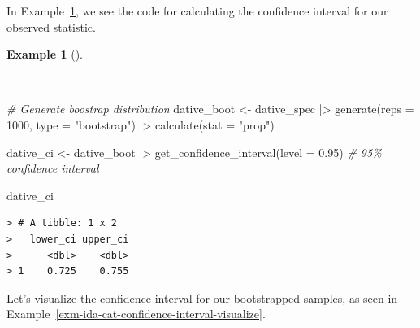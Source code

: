 \documentclass[
  letterpaper,
]{latex/krantz}
\newenvironment{Shaded}{\begin{snugshade}}{\end{snugshade}}
\newcommand{\AttributeTok}[1]{\textcolor[rgb]{0.00,0.00,0.00}{#1}}
\newcommand{\CommentTok}[1]{\textcolor[rgb]{0.00,0.00,0.00}{\textit{#1}}}
\newcommand{\DecValTok}[1]{\textcolor[rgb]{0.00,0.00,0.00}{#1}}
\newcommand{\FloatTok}[1]{\textcolor[rgb]{0.00,0.00,0.00}{#1}}
\newcommand{\FunctionTok}[1]{\textcolor[rgb]{0.00,0.00,0.00}{#1}}
\newcommand{\NormalTok}[1]{\textcolor[rgb]{0.00,0.00,0.00}{#1}}
\newcommand{\OtherTok}[1]{\textcolor[rgb]{0.00,0.00,0.00}{#1}}
\newcommand{\SpecialCharTok}[1]{\textcolor[rgb]{0.00,0.00,0.00}{#1}}
\newcommand{\StringTok}[1]{\textcolor[rgb]{0.00,0.00,0.00}{#1}}
\theoremstyle{definition}
\newtheorem{example}{Example}[chapter]
\theoremstyle{remark}
\begin{document}
In Example~\ref{exm-ida-cat-confidence-interval}, we see the code for
calculating the confidence interval for our observed statistic.

\begin{example}[]\protect\hypertarget{exm-ida-cat-confidence-interval}{}\label{exm-ida-cat-confidence-interval}

~

\begin{Shaded}
\begin{Highlighting}[]
\CommentTok{\# Generate boostrap distribution}
\NormalTok{dative\_boot }\OtherTok{\textless{}{-}}
\NormalTok{  dative\_spec }\SpecialCharTok{|\textgreater{}}
  \FunctionTok{generate}\NormalTok{(}\AttributeTok{reps =} \DecValTok{1000}\NormalTok{, }\AttributeTok{type =} \StringTok{"bootstrap"}\NormalTok{) }\SpecialCharTok{|\textgreater{}}
  \FunctionTok{calculate}\NormalTok{(}\AttributeTok{stat =} \StringTok{"prop"}\NormalTok{)}

\NormalTok{dative\_ci }\OtherTok{\textless{}{-}}
\NormalTok{  dative\_boot }\SpecialCharTok{|\textgreater{}}
  \FunctionTok{get\_confidence\_interval}\NormalTok{(}\AttributeTok{level =} \FloatTok{0.95}\NormalTok{) }\CommentTok{\# 95\% confidence interval}

\NormalTok{dative\_ci}
\end{Highlighting}
\end{Shaded}

\begin{verbatim}
> # A tibble: 1 x 2
>   lower_ci upper_ci
>      <dbl>    <dbl>
> 1    0.725    0.755
\end{verbatim}

\end{example}

Let's visualize the confidence interval for our bootstrapped samples, as
seen in Example~\ref{exm-ida-cat-confidence-interval-visualize}.
\end{document}
